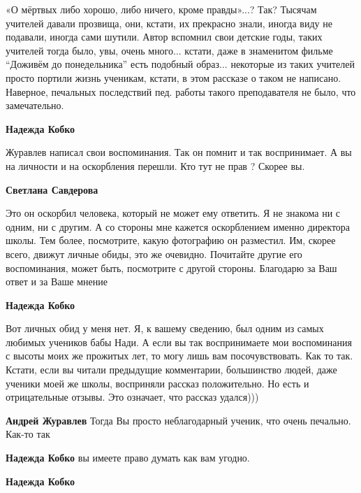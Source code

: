 \begin{itemize}
\begin{itemize} %

«О мёртвых либо хорошо, либо ничего, кроме правды»...? Так? Тысячам учителей
давали прозвища, они, кстати, их прекрасно знали, иногда виду не подавали,
иногда сами шутили. Автор вспомнил свои детские годы, таких учителей тогда
было, увы, очень много... кстати, даже в знаменитом фильме \enquote{Доживём до
понедельника} есть подобный образ... некоторые из таких учителей просто портили
жизнь ученикам, кстати, в этом рассказе о таком не написано. Наверное,
печальных последствий пед. работы такого преподавателя не было, что
замечательно.

\textbf{Надежда Кобко} 

Журавлев написал свои воспоминания. Так он помнит и так воспринимает. А вы на
личности и на оскорбления перешли. Кто тут не прав ? Скорее вы.

\begin{itemize} %
\textbf{Светлана Савдерова} 

Это он оскорбил человека, который не может ему ответить. Я не знакома ни с
одним, ни с другим. А со стороны мне кажется оскорблением именно директора
школы. Тем более, посмотрите, какую фотографию он разместил. Им, скорее всего,
движут личные обиды, это же очевидно. Почитайте другие его воспоминания, может
быть, посмотрите с другой стороны. Благодарю за Ваш ответ и за Ваше мнение


\textbf{Надежда Кобко} 

Вот личных обид у меня нет. Я, к вашему сведению, был одним из самых любимых
учеников бабы Нади. А если вы так воспринимаете мои воспоминания с высоты моих
же прожитых лет, то могу лишь вам посочувствовать. Как то так. Кстати, если вы
читали предыдущие комментарии, большинство людей, даже ученики моей же школы,
восприняли рассказ положительно. Но есть и отрицательные отзывы. Это означает,
что рассказ удался)))

\end{itemize} %

\textbf{Андрей Журавлев} Тогда Вы просто неблагодарный ученик, что очень печально. Как-то так

\begin{itemize} %
\textbf{Надежда Кобко} вы имеете право думать как вам угодно.

\textbf{Надежда Кобко} 


\end{itemize}
\end{itemize}
\end{itemize}
